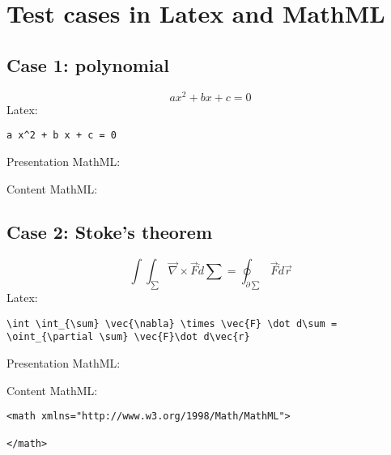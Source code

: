 \section{Test cases in Latex and MathML}\label{sec:appendix_test_cases}

\subsection{Case 1: polynomial}

\begin{equation}
a x^2 + b x + c = 0
\label{eq:polynomial_case1}
\end{equation}
Latex: 
\begin{verbatim}
a x^2 + b x + c = 0
\end{verbatim}

Presentation MathML:




Content MathML:


\subsection{Case 2: Stoke's theorem}
\begin{equation}
\int \int_{\sum} \vec{\nabla} \times \vec{F} \dot d\sum = \oint_{\partial \sum} \vec{F}\dot d\vec{r}
\label{eq:stokes_case2}
\end{equation}
Latex:
\begin{verbatim}
\int \int_{\sum} \vec{\nabla} \times \vec{F} \dot d\sum = 
\oint_{\partial \sum} \vec{F}\dot d\vec{r}
\end{verbatim}

Presentation MathML:


Content MathML:
\begin{verbatim}
<math xmlns="http://www.w3.org/1998/Math/MathML">

</math>
\end{verbatim}

